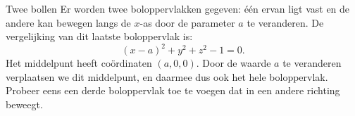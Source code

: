 \begin{surferPage}{Twee bollen}
Er worden twee boloppervlakken gegeven: \'e\'en ervan ligt vast en de andere kan bewegen langs de $x$-as door de parameter $a$ te veranderen.
De vergelijking van dit laatste boloppervlak is:
\[(x-a)^2+y^2+z^2-1=0.\]
Het middelpunt heeft co\"ordinaten $(a,0,0)$. Door de waarde $a$ te veranderen verplaatsen we dit middelpunt, en daarmee dus ook het hele boloppervlak.
Probeer eens een derde boloppervlak toe te voegen dat in een andere richting beweegt.
\end{surferPage}
